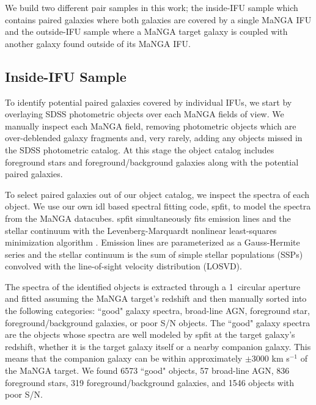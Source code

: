 \documentclass[iop,revtex4,twocolumn,apj,numberedappendix,appendixfloats]{emulateapj}
\begin{document}
We build two different pair samples in this work; the inside-IFU sample which contains paired galaxies where both galaxies are covered by a single MaNGA IFU and the outside-IFU sample where a MaNGA target galaxy is coupled with another galaxy found outside of its MaNGA IFU. 

\subsection{Inside-IFU Sample}\label{sec:inside}

To identify potential paired galaxies covered by individual IFUs, we start by overlaying SDSS photometric objects over each MaNGA fields of view. We manually inspect each MaNGA field, removing photometric objects which are over-deblended galaxy fragments and, very rarely, adding any objects missed in the SDSS photometric catalog. At this stage the object catalog includes foreground stars and foreground/background galaxies along with the potential paired galaxies. 

To select paired galaxies out of our object catalog, we inspect the spectra of each object. We use our own {\sc idl} based spectral fitting code, {\sc spfit}, to model the spectra from the MaNGA datacubes. {\sc spfit} simultaneously fits emission lines and the stellar continuum with the Levenberg-Marquardt nonlinear least-squares minimization algorithm . Emission lines are parameterized as a Gauss-Hermite series and the stellar continuum is the sum of simple stellar populations (SSPs) convolved with the line-of-sight velocity distribution (LOSVD).

The spectra of the identified objects is extracted through a 1\arcsec\ circular aperture and fitted assuming the MaNGA target's redshift and then manually sorted into the following categories: ``good" galaxy spectra, broad-line AGN, foreground star, foreground/background galaxies, or poor S/N objects. The ``good" galaxy spectra are the objects whose spectra are well modeled by {\sc spfit} at the target galaxy's redshift, whether it is the target galaxy itself or a nearby companion galaxy. This means that the companion galaxy can be within approximately $\pm$3000 km s$^{-1}$ of the MaNGA target. We found 6573 ``good" objects, 57 broad-line AGN, 836 foreground stars, 319 foreground/background galaxies, and 1546 objects with poor S/N. 
\end{document}
